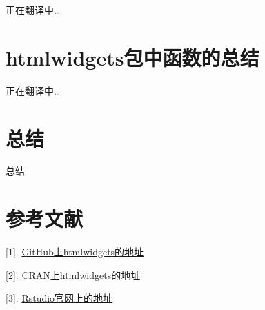 \documentclass[]{book}
\theoremstyle{definition}
\theoremstyle{definition}
\theoremstyle{definition}
\theoremstyle{remark}
\begin{document}
正在翻译中\ldots{}

\chapter{htmlwidgets包中函数的总结}\label{htmlwidgets-pkgintro}

正在翻译中\ldots{}

\chapter{总结}\label{summary}

总结

\chapter{参考文献}\label{reference}

{[}1{]}.
\href{https://github.com/ramnathv/htmlwidgets}{GitHub上htmlwidgets的地址}

{[}2{]}.
\href{https://CRAN.R-project.org/package=htmlwidgets}{CRAN上htmlwidgets的地址}

{[}3{]}. \href{https://www.htmlwidgets.org/}{Rstudio官网上的地址}


\end{document}
